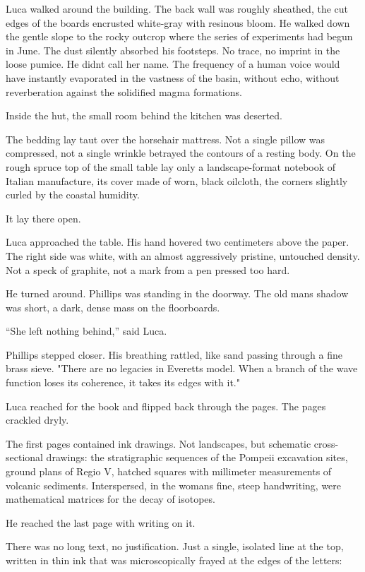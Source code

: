 \documentclass[
  ngerman,
]{article}
\begin{document}
Luca walked around the building. The back wall was roughly sheathed, the
cut edges of the boards encrusted white-gray with resinous bloom. He
walked down the gentle slope to the rocky outcrop where the series of
experiments had begun in June. The dust silently absorbed his footsteps.
No trace, no imprint in the loose pumice. He didn\textquotesingle t call
her name. The frequency of a human voice would have instantly evaporated
in the vastness of the basin, without echo, without reverberation
against the solidified magma formations.

Inside the hut, the small room behind the kitchen was deserted.

The bedding lay taut over the horsehair mattress. Not a single pillow
was compressed, not a single wrinkle betrayed the contours of a resting
body. On the rough spruce top of the small table lay only a
landscape-format notebook of Italian manufacture, its cover made of
worn, black oilcloth, the corners slightly curled by the coastal
humidity.

It lay there open.

Luca approached the table. His hand hovered two centimeters above the
paper. The right side was white, with an almost aggressively pristine,
untouched density. Not a speck of graphite, not a mark from a pen
pressed too hard.

He turned around. Phillips was standing in the doorway. The old
man\textquotesingle s shadow was short, a dark, dense mass on the
floorboards.

``She left nothing behind,'' said Luca.

Phillips stepped closer. His breathing rattled, like sand passing
through a fine brass sieve. "There are no legacies in
Everett\textquotesingle s model. When a branch of the wave function
loses its coherence, it takes its edges with it."

Luca reached for the book and flipped back through the pages. The pages
crackled dryly.

The first pages contained ink drawings. Not landscapes, but schematic
cross-sectional drawings: the stratigraphic sequences of the Pompeii
excavation sites, ground plans of Regio V, hatched squares with
millimeter measurements of volcanic sediments. Interspersed, in the
woman\textquotesingle s fine, steep handwriting, were mathematical
matrices for the decay of isotopes.

He reached the last page with writing on it.

There was no long text, no justification. Just a single, isolated line
at the top, written in thin ink that was microscopically frayed at the
edges of the letters:
\end{document}
